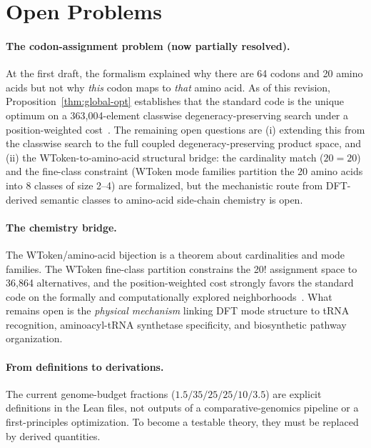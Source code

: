 \documentclass[11pt,a4paper]{article}
\begin{document}
\section{Open Problems}
\label{sec:open}

\paragraph{The codon-assignment problem (now partially resolved).}
At the first draft, the formalism explained why there are 64 codons and 20 amino acids but not why \emph{this} codon maps to \emph{that} amino acid. As of this revision, Proposition~\ref{thm:global-opt} establishes that the standard code is the unique optimum on a 363,004-element classwise degeneracy-preserving search under a position-weighted cost~\cite{Washburn2026b}. The remaining open questions are (i) extending this from the classwise search to the full coupled degeneracy-preserving product space, and (ii) the WToken-to-amino-acid structural bridge: the cardinality match ($20 = 20$) and the fine-class constraint (WToken mode families partition the 20 amino acids into 8 classes of size 2--4) are formalized, but the mechanistic route from DFT-derived semantic classes to amino-acid side-chain chemistry is open.

\paragraph{The chemistry bridge.}
The WToken/amino-acid bijection is a theorem about cardinalities and mode families. The WToken fine-class partition constrains the 20! assignment space to 36,864 alternatives, and the position-weighted cost strongly favors the standard code on the formally and computationally explored neighborhoods~\cite{Washburn2026b}. What remains open is the \emph{physical mechanism} linking DFT mode structure to tRNA recognition, aminoacyl-tRNA synthetase specificity, and biosynthetic pathway organization.

\paragraph{From definitions to derivations.}
The current genome-budget fractions ($1.5/35/25/25/10/3.5$) are explicit definitions in the Lean files, not outputs of a comparative-genomics pipeline or a first-principles optimization. To become a testable theory, they must be replaced by derived quantities.
\end{document}
